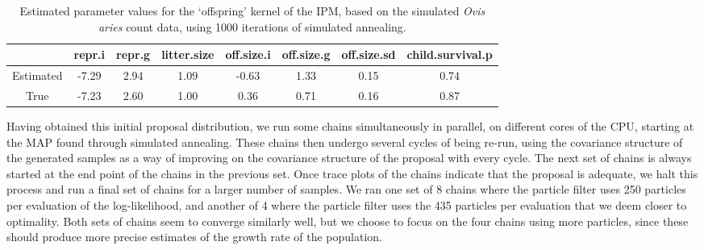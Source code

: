 \documentclass[a4paper,12pt]{article}
\begin{document}
\begin{table}[ht]
\centering
\begin{tabular}{cccccccc}
  \hline
 & repr.i & repr.g & litter.size & off.size.i & off.size.g & off.size.sd & child.survival.p \\ 
  \hline
Estimated & -7.29 & 2.94 & 1.09 & -0.63 & 1.33 & 0.15 & 0.74 \\ 
  True & -7.23 & 2.60 & 1.00 & 0.36 & 0.71 & 0.16 & 0.87 \\ 
   \hline
\end{tabular}
\caption{\label{SANN2}Estimated parameter values for the `offspring' kernel of the IPM, based on the simulated \textit{Ovis aries} count data, using 1000 iterations of simulated annealing.}
\end{table}

Having obtained this initial proposal distribution, we run some chains simultaneously in parallel, on different cores of the CPU, starting at the MAP found through simulated annealing. These chains then undergo several cycles of being re-run, using the covariance structure of the generated samples as a way of improving on the covariance structure of the proposal with every cycle. The next set of chains is always started at the end point of the chains in the previous set. Once trace plots of the chains indicate that the proposal is adequate, we halt this process and run a final set of chains for a larger number of samples. We ran one set of 8 chains where the particle filter uses 250 particles per evaluation of the log-likelihood, and another of 4 where the particle filter uses the 435 particles per evaluation that we deem closer to optimality. Both sets of chains seem to converge similarly well, but we choose to focus on the four chains using more particles, since these should produce more precise estimates of the growth rate of the population.

\end{document}
